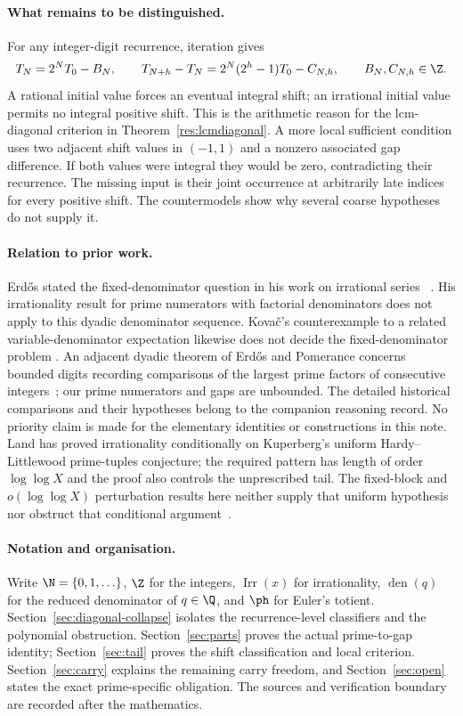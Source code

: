 \documentclass[11pt]{article}
\begin{document}
\paragraph{What remains to be distinguished.}
For any integer-digit recurrence, iteration gives
\[
 T_N=2^NT_0-B_N,\qquad
 T_{N+h}-T_N=2^N(2^h-1)T_0-C_{N,h},
 \qquad B_N,C_{N,h}\in\Z.
\]
A rational initial value forces an eventual integral shift; an irrational
initial value permits no integral positive shift.  This is the arithmetic
reason for the lcm-diagonal criterion in Theorem~\ref{res:lcmdiagonal}.
A more local sufficient condition uses two adjacent shift values in
$(-1,1)$ and a nonzero associated gap difference.  If both values were
integral they would be zero, contradicting their recurrence.  The missing
input is their joint occurrence at arbitrarily late indices for every
positive shift.  The countermodels show why several coarse hypotheses do
not supply it.

\paragraph{Relation to prior work.}
Erd\H{o}s stated the fixed-denominator question in his work on irrational
series~\cite[p.~94]{erdos1958}\cite[p.~62]{erdosgraham1980}%
\cite[p.~103]{erdos1988}.  His irrationality result for prime numerators
with factorial denominators does not apply to this dyadic denominator
sequence.  Kova\v{c}'s counterexample to a related variable-denominator
expectation likewise does not decide the fixed-denominator problem
\cite{kovac2026}.  An adjacent dyadic theorem of Erd\H{o}s and Pomerance
concerns bounded digits recording comparisons of the largest prime factors
of consecutive integers~\cite[\S7]{erdospomerance1978}; our prime numerators
and gaps are unbounded.  The detailed historical comparisons and their
hypotheses belong to the companion reasoning record.  No priority claim
is made for the elementary identities or constructions in this note.
Land has proved irrationality conditionally on Kuperberg's uniform
Hardy--Littlewood prime-tuples conjecture; the required pattern has length of
order $\log\log X$ and the proof also controls the unprescribed tail.  The
fixed-block and $o(\log\log X)$ perturbation results here neither supply that
uniform hypothesis nor obstruct that conditional argument~\cite{land2026}.

\paragraph{Notation and organisation.}
Write $\N=\{0,1,\ldots\}$, $\Z$ for the integers,
$\operatorname{Irr}(x)$ for irrationality, $\operatorname{den}(q)$ for the
reduced denominator of $q\in\Q$, and $\ph$ for Euler's totient.
Section~\ref{sec:diagonal-collapse} isolates the recurrence-level
classifiers and the polynomial obstruction.
Section~\ref{sec:parts} proves the actual prime-to-gap identity;
Section~\ref{sec:tail} proves the shift classification and local criterion.
Section~\ref{sec:carry} explains the remaining carry freedom, and
Section~\ref{sec:open} states the exact prime-specific obligation.
The sources and verification boundary are recorded after the mathematics.
\end{document}
